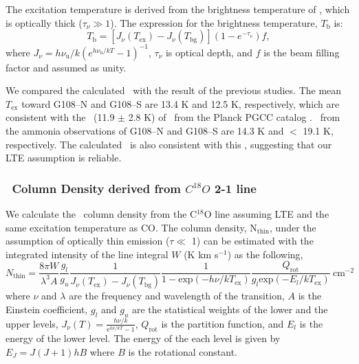 \documentclass[manuscript]{aastex}
\begin{document}
The excitation temperature is derived from the brightness temperature of \tcot, which is optically thick ($\tau_{\nu} \gg 1$).
The expression for the brightness temperature, $T_{\textrm{b}}$ is:
\begin{equation}
T_{\textrm{b}}=[J_\nu(T_{\textrm{ex}})-J_{\nu}(T_{\textrm{bg}})](1-e^{-\tau_{\nu}})f,
\end{equation}
where $J_{\nu}=h\nu_{\textrm{u}}/k(e^{h\nu_{\textrm{u}}/kT} -1)^{-1}$, $\tau_{\nu}$ is optical depth, and $f$ is the beam filling factor and assumed as unity.


We compared the calculated \tex\ with the result of the previous studies.
The mean $T_{\textrm{ex}}$ toward G108--N and G108--S are 13.4 K and 12.5 K, respectively, which are consistent with the \td\ (11.9 $\pm$ 2.8 K) of \sou\ from the Planck PGCC catalog \citep{planck15}.
\tkin\ from the ammonia observations \citep{tatematsu17} of G108--N and G108--S are 14.3 K and $<$ 19.1 K, respectively.
The calculated \tex\ is also consistent with this \tkin, suggesting that our LTE assumption is reliable.


\subsubsection{\atomh\ Column Density derived from $C^{\textit{18}}O$ 2-1 line}
We calculate the \atomh\ column density from the C$^{18}$O line assuming LTE and the same excitation temperature as CO.
The column density, N$_{\textrm{thin}}$, under the assumption of optically thin emission ($\tau \ll$ 1) can be estimated with the integrated intensity of the line integral $W$ (K km s$^{-1}$) \citep{schnee07} as the following,
\begin{equation}
N_{\textrm{thin}} = \frac{8{\pi}W}{{\lambda}^{3}A}\frac{g_{l}}{g_{u}} \frac{1}{J_{\nu}(T_{\textrm{ex}}) - J_{\nu}(T_{\textrm{bg}})}
\frac{1}{1 - \textrm{exp}(-h{\nu}/kT_{\textrm{ex}})} \frac{Q_\textrm{rot}}{g_{l} \textrm{exp}(-E_{l}/kT_{\textrm{ex}})}\:\textrm{cm}^{-2}
\end{equation}
where $\nu$ and $\lambda$ are the frequency and wavelength of the transition, $A$ is the Einstein coefficient, $g_l$ and $g_u$ are the statistical weights of the lower and the upper levels, $J_{\nu}(T) = \frac{h{\nu}/k}{\textrm{e}^{h{\nu}/kT}-1}$, $Q_{\textrm{rot}}$ is the partition function, and $E_l$ is the energy of the lower level.
The energy of the each level is given by $E_{J}=J(J+1)hB$ where $B$ is the rotational constant.
\end{document}
